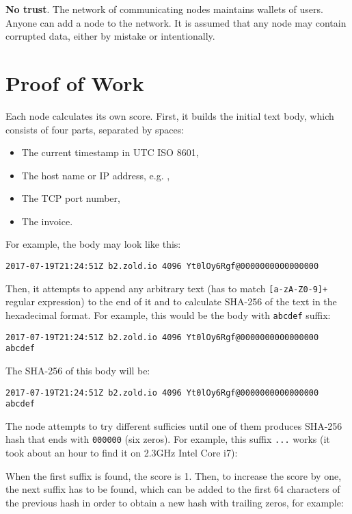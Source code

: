 \documentclass[11pt,oneside]{article}
\begin{document}
\textbf{No trust}.
The network of communicating nodes maintains wallets of users.
Anyone can add a node to the network.
It is assumed that any node may contain corrupted data, either by mistake or intentionally.

\section{Proof of Work}

Each node calculates its own score.
First, it builds the initial text body, which consists of four parts,
separated by spaces:

\begin{itemize}
\item The current timestamp in UTC ISO 8601,
\item The host name or IP address, e.g. ,
\item The TCP port number,
\item The invoice.
\end{itemize}

For example, the body may look like this:

\begin{verbatim}
2017-07-19T21:24:51Z b2.zold.io 4096 Yt0lOy6Rgf@0000000000000000
\end{verbatim}

Then, it attempts to append any
arbitrary text (has to match \texttt{[a-zA-Z0-9]+} regular expression)
to the end of it and to calculate SHA-256 of the text
in the hexadecimal format. For example, this would be the body
with \texttt{abcdef} suffix:

\begin{verbatim}
2017-07-19T21:24:51Z b2.zold.io 4096 Yt0lOy6Rgf@0000000000000000 abcdef
\end{verbatim}

The SHA-256 of this body will be:

\begin{verbatim}
2017-07-19T21:24:51Z b2.zold.io 4096 Yt0lOy6Rgf@0000000000000000 abcdef
\end{verbatim}

The node attempts to try different sufficies until one of them produces
SHA-256 hash that ends with \texttt{000000} (six zeros). For example, this
suffix \texttt{...} works
(it took about an hour to find it on 2.3GHz Intel Core i7):

When the first suffix is found, the score is 1. Then, to
increase the score by one, the next suffix has to be found, which
can be added to the first 64 characters of the previous hash
in order to obtain a new hash with trailing zeros, for example:
\end{document}
